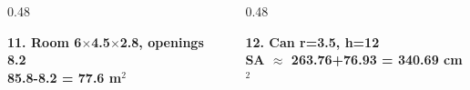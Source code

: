 \documentclass[aspectratio=169,12pt]{beamer}
\begin{document}
\begin{frame}[t]
\begin{columns}[T,onlytextwidth]
\end{columns}
\vspace{0.15em}
\begin{columns}[T,onlytextwidth]
\begin{column}{0.48\textwidth}\begin{AnsCard}\small\textcolor{mmgreenDeep}{\textbf{11. Room 6$\times$4.5$\times$2.8, openings 8.2}}\\\vspace{0.1em}\textcolor{mmanswerColor}{\textbf{85.8-8.2 = 77.6 m$^2$}}\end{AnsCard}\end{column}
\begin{column}{0.48\textwidth}\begin{AnsCard}\small\textcolor{mmgreenDeep}{\textbf{12. Can r=3.5, h=12}}\\\vspace{0.1em}\textcolor{mmanswerColor}{\textbf{SA $\approx$ 263.76+76.93 = 340.69 cm$^2$}}\end{AnsCard}\end{column}
\end{columns}
\end{frame}
\end{document}
